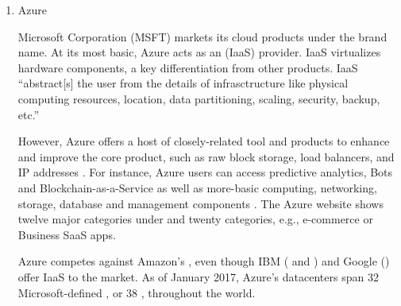 \begin{enumerate}
\item {} 
Azure

Microsoft Corporation (MSFT) markets its cloud products under the
 brand name. At its most basic, Azure acts as an
 (IaaS) provider.  IaaS virtualizes
hardware components, a key differentiation from other
 products. IaaS ``abstract{[}s{]} the user from the
details of infrasctructure like physical computing resources,
location, data partitioning, scaling, security, backup, etc.''
\label{\detokenize{i524/technologies:id173}}{\hyperref[\detokenize{i524/technologies:www-wikipedia-cloud}]{\sphinxcrossref{{[}149{]}}}}

However, Azure offers a host of closely-related tool and products
to enhance and improve the core product, such as raw block
storage, load balancers, and IP addresses
\label{\detokenize{i524/technologies:id174}}{\hyperref[\detokenize{i524/technologies:www-azure-msft}]{\sphinxcrossref{{[}150{]}}}}. For instance, Azure users can access
predictive analytics, Bots and Blockchain-as-a-Service
\label{\detokenize{i524/technologies:id175}}{\hyperref[\detokenize{i524/technologies:www-azure-msft}]{\sphinxcrossref{{[}150{]}}}} as well as more-basic computing,
networking, storage, database and management components
\label{\detokenize{i524/technologies:id176}}{\hyperref[\detokenize{i524/technologies:www-sec-edgar-msft}]{\sphinxcrossref{{[}151{]}}}}.  The Azure website shows twelve major
categories under  and twenty  categories,
e.g., e-commerce or Business SaaS apps.

Azure competes against Amazon's ,
\label{\detokenize{i524/technologies:id177}}{\hyperref[\detokenize{i524/technologies:www-aws-amzn}]{\sphinxcrossref{{[}152{]}}}} even though IBM (
\label{\detokenize{i524/technologies:id178}}{\hyperref[\detokenize{i524/technologies:www-softlayer-ibm}]{\sphinxcrossref{{[}153{]}}}} and  \label{\detokenize{i524/technologies:id179}}{\hyperref[\detokenize{i524/technologies:www-bluemix-ibm}]{\sphinxcrossref{{[}154{]}}}})
and Google () \label{\detokenize{i524/technologies:id180}}{\hyperref[\detokenize{i524/technologies:www-cloud-google}]{\sphinxcrossref{{[}155{]}}}}
offer IaaS to the market.  As of January 2017, Azure's datacenters
span 32 Microsoft-defined , or 38 ,
throughout the world. \label{\detokenize{i524/technologies:id181}}{\hyperref[\detokenize{i524/technologies:www-azure-msft}]{\sphinxcrossref{{[}150{]}}}}


\end{enumerate}
